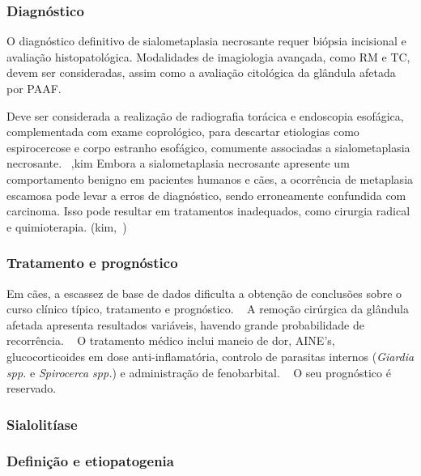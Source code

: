 \subsubsection{Diagnóstico}


O diagnóstico definitivo de sialometaplasia necrosante requer biópsia incisional e avaliação histopatológica. Modalidades de imagiologia avançada, como RM e TC, devem ser consideradas, assim como a avaliação citológica da glândula afetada por PAAF. ~\cite{reiter_bsava_2018}


Deve ser considerada a realização de radiografia torácica e endoscopia esofágica, complementada com exame coprológico, para descartar etiologias como espirocercose e corpo estranho esofágico, comumente associadas a sialometaplasia necrosante. ~\cite{schroeder_salivary_1998,vanderMerwe2012},kim Embora a sialometaplasia necrosante apresente um comportamento benigno em pacientes humanos e cães, a ocorrência de metaplasia escamosa pode levar a erros de diagnóstico, sendo erroneamente confundida com carcinoma. Isso pode resultar em tratamentos inadequados, como cirurgia radical e quimioterapia. (kim,~\cite{Mukaratirwa2015})


\subsubsection{Tratamento e prognóstico}


Em cães, a escassez de base de dados dificulta a obtenção de conclusões sobre o curso clínico típico, tratamento e prognóstico. ~\cite{bsava_2020_gastro,Mukaratirwa2015} A remoção cirúrgica da glândula afetada apresenta resultados variáveis, havendo grande probabilidade de recorrência. ~\cite{Mukaratirwa2015,bsava_2020_gastro} O tratamento médico inclui maneio de dor, AINE’s, glucocorticoides em dose anti-inflamatória, controlo de parasitas internos (\textit{Giardia spp.} e \textit{Spirocerca spp.}) e administração de fenobarbital. ~\cite{reiter_bsava_2018} O seu prognóstico é reservado. ~\cite{bsava_2020_gastro,Mukaratirwa2015,reiter_bsava_2018}



\subsubsection{Sialolitíase}
\subsubsection{Definição e etiopatogenia}


